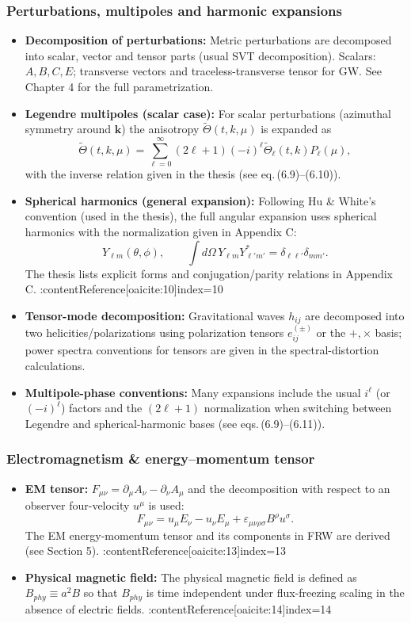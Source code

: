\subsubsection{Perturbations, multipoles and harmonic expansions}
\begin{itemize}
  \item \textbf{Decomposition of perturbations:} Metric perturbations are decomposed into scalar, vector and tensor parts (usual SVT decomposition). Scalars: $A,B,C,E$; transverse vectors and traceless-transverse tensor for GW. See Chapter 4 for the full parametrization. 
  \item \textbf{Legendre multipoles (scalar case):} For scalar perturbations (azimuthal symmetry around $\mathbf{k}$) the anisotropy $\tilde\Theta(t,k,\mu)$ is expanded as
  \[ \tilde\Theta(t,k,\mu)=\sum_{\ell=0}^\infty (2\ell+1)(-i)^\ell \tilde\Theta_\ell(t,k)P_\ell(\mu), \]
  with the inverse relation given in the thesis (see eq.\,(6.9)--(6.10)). 
  \item \textbf{Spherical harmonics (general expansion):} Following Hu \& White's convention (used in the thesis), the full angular expansion uses spherical harmonics with the normalization given in Appendix C:
  \[ Y_{\ell m}(\theta,\phi),\qquad \int d\Omega\,Y_{\ell m}Y_{\ell' m'}^\ast=\delta_{\ell\ell'}\delta_{mm'}. \]
  The thesis lists explicit forms and conjugation/parity relations in Appendix C. :contentReference[oaicite:10]{index=10}
  \item \textbf{Tensor-mode decomposition:} Gravitational waves $h_{ij}$ are decomposed into two helicities/polarizations using polarization tensors $e^{(\pm)}_{ij}$ or the $+,\times$ basis; power spectra conventions for tensors are given in the spectral-distortion calculations. 
  \item \textbf{Multipole-phase conventions:} Many expansions include the usual $i^\ell$ (or $(-i)^\ell$) factors and the $(2\ell+1)$ normalization when switching between Legendre and spherical-harmonic bases (see eqs.\,(6.9)--(6.11)). 
\end{itemize}

\subsubsection{Electromagnetism \& energy--momentum tensor}
\begin{itemize}
  \item \textbf{EM tensor:} $F_{\mu\nu}=\partial_\mu A_\nu-\partial_\nu A_\mu$ and the decomposition with respect to an observer four-velocity $u^\mu$ is used:
  \[ F_{\mu\nu}=u_\mu E_\nu-u_\nu E_\mu + \varepsilon_{\mu\nu\rho\sigma}B^\rho u^\sigma. \]
  The EM energy-momentum tensor and its components in FRW are derived (see Section 5). :contentReference[oaicite:13]{index=13}
  \item \textbf{Physical magnetic field:} The physical magnetic field is defined as $B_{ phy}\equiv a^2 B$ so that $B_{ phy}$ is time independent under flux-freezing scaling in the absence of electric fields. :contentReference[oaicite:14]{index=14}
\end{itemize}

